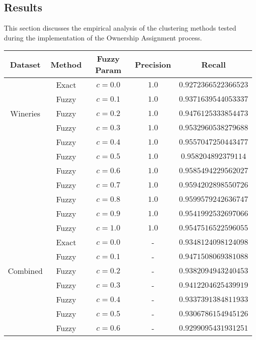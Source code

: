 \subsection{Results} \label{subsection:own_results}
This section discusses the empirical analysis of the clustering methods tested during the implementation of the Ownership Assignment process. 
\small{
\begin{table}[h!]
	\begin{center}
		\begin{tabular}{ |c|c|c|c|c| } 
			\hline
			Dataset & Method & Fuzzy Param & Precision & Recall \\
			\hline
			\multirow{5}{4em}{Wineries} 
                & Exact & $c = 0.0$ & $1.0$ & $0.9272366522366523$  \\ 
				& Fuzzy & $c = 0.1$ & $1.0$ & $0.9371639544053337$  \\ 
				& Fuzzy & $c = 0.2$ & $1.0$ & $0.9476125333854473$  \\
				& Fuzzy & $c = 0.3$ & $1.0$ & $0.9532960538279688$  \\ 
				& Fuzzy & $c = 0.4$ & $1.0$ & $0.9557047250443477$  \\ 
				& Fuzzy & $c = 0.5$ & $1.0$ & $0.958204892379114$  \\ 
				& Fuzzy & $c = 0.6$ & $1.0$ & $0.9585494229562027$  \\ 
				& Fuzzy & $c = 0.7$ & $1.0$ & $0.9594202898550726$  \\ 
				& Fuzzy & $c = 0.8$ & $1.0$ & $0.9599579242636747$  \\ 
				& Fuzzy & $c = 0.9$ & $1.0$ & $0.9541992532697066$  \\ 
				& Fuzzy & $c = 1.0$ & $1.0$ & $0.9547516522596055$  \\ 
			\hline
			\multirow{5}{4em}{Combined} 
                & Exact & $c = 0.0$ & - & $0.9348124098124098$  \\ 
				& Fuzzy & $c = 0.1$ & - & $0.9471508069381088$  \\ 
				& Fuzzy & $c = 0.2$ & - & $0.9382094943240453$  \\ 
				& Fuzzy & $c = 0.3$ & - & $0.9412204625439919$  \\ 
				& Fuzzy & $c = 0.4$ & - & $0.9337391384811933$  \\ 
				& Fuzzy & $c = 0.5$ & - & $0.9306786154945126$  \\ 
				& Fuzzy & $c = 0.6$ & - & $0.9299095431931251$  \\ 

\end{tabular}
\end{center}
\end{table}}
